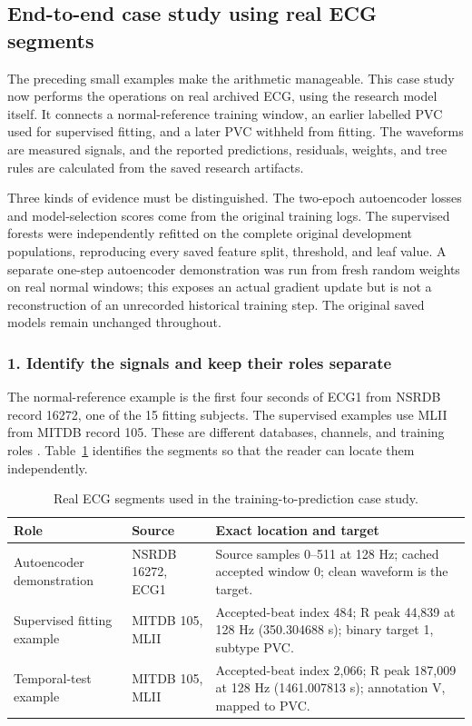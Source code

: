 \subsection{End-to-end case study using real ECG segments}
\label{sec:method-real-case}

The preceding small examples make the arithmetic manageable. This case study
now performs the operations on real archived ECG, using the research model
itself. It connects a normal-reference training window, an earlier labelled
PVC used for supervised fitting, and a later PVC withheld from fitting.
The waveforms are measured signals, and the reported predictions, residuals,
weights, and tree rules are calculated from the saved research artifacts.

Three kinds of evidence must be distinguished. The two-epoch autoencoder
losses and model-selection scores come from the original training logs.
The supervised forests were independently refitted on the complete original
development populations, reproducing every saved feature split, threshold,
and leaf value. A separate one-step autoencoder demonstration was run from
fresh random weights on real normal windows; this exposes an actual gradient
update but is not a reconstruction of an unrecorded historical training step.
The original saved models remain unchanged throughout.

\subsubsection*{1. Identify the signals and keep their roles separate}

The normal-reference example is the first four seconds of ECG1 from NSRDB
record 16272, one of the 15 fitting subjects. The supervised examples use
MLII from MITDB record 105. These are different databases, channels, and
training roles \cite{nsrdb,mitdb}. Table~\ref{tab:real-case-provenance} identifies
the segments so that the reader can locate them independently.

\begin{table}[H]
\centering
\small
\caption{Real ECG segments used in the training-to-prediction case study.}
\label{tab:real-case-provenance}
\begin{tabular}{@{}>{\raggedright\arraybackslash}p{3.5cm}
>{\raggedright\arraybackslash}p{3.5cm}
>{\raggedright\arraybackslash}p{5.7cm}@{}}
\toprule
Role & Source & Exact location and target\\
\midrule
Autoencoder demonstration & NSRDB 16272, ECG1 & Source samples 0--511 at
128 Hz; cached accepted window 0; clean waveform is the target.\\
\addlinespace
Supervised fitting example & MITDB 105, MLII & Accepted-beat index 484;
R peak 44,839 at 128 Hz (350.304688 s); binary target 1, subtype PVC.\\
\addlinespace
Temporal-test example & MITDB 105, MLII & Accepted-beat index 2,066;
R peak 187,009 at 128 Hz (1461.007813 s); annotation V, mapped to PVC.\\
\bottomrule
\end{tabular}
\end{table}

